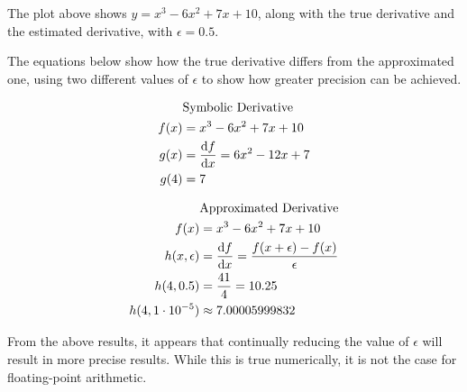 \documentclass[12pt]{article}
\begin{document}

The plot above shows $y=x^3-6x^2+7x+10$, along with the true derivative and the estimated derivative, with $\epsilon=0.5$.

The equations below show how the true derivative differs from the approximated one, using two different values of $\epsilon$ to show how greater precision can be achieved.

\begin{equation}
\begin{split}
&\text{Symbolic Derivative} \\
f(x)&=x^3-6x^2+7x+10 \\
g(x)&=\dv{f}{x}=6x^2-12x+7 \\
g(4)&=7
\end{split}
\end{equation}

\begin{equation}
\begin{split}
&\text{Approximated Derivative} \\
f(x)&=x^3-6x^2+7x+10 \\
h(x, \epsilon)&=\dv{f}{x}=\frac{f(x+\epsilon)-f(x)}{\epsilon} \\
h(4, 0.5)&=\frac{41}{4}=10.25 \\
h(4, 1 \cdot 10^{-5})& \approx 7.00005999832
\end{split}
\end{equation}

From the above results, it appears that continually reducing the value of $\epsilon$ will result in more precise results. While this is true numerically, it is not the case for floating-point arithmetic. 
\end{document}
